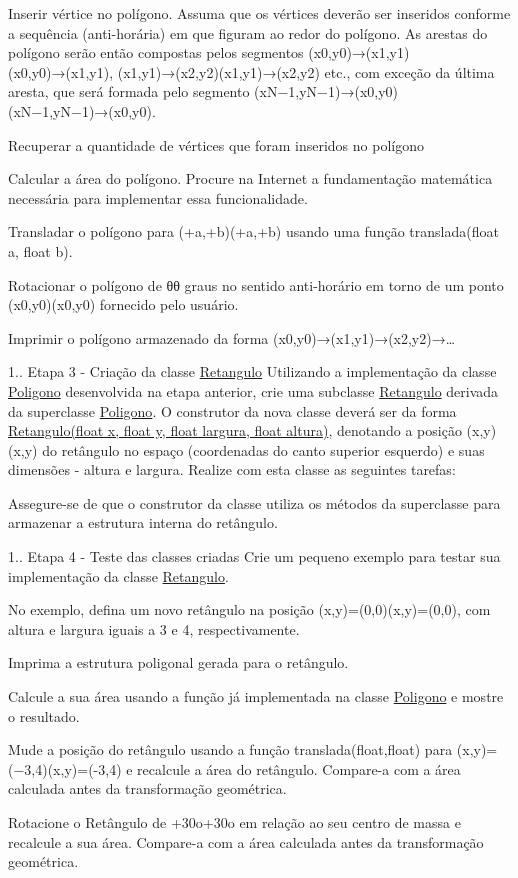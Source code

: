 Inserir vértice no polígono. Assuma que os vértices deverão ser inseridos conforme a sequência (anti-\/horária) em que figuram ao redor do polígono. As arestas do polígono serão então compostas pelos segmentos (x0,y0)→(x1,y1)(x0,y0)→(x1,y1), (x1,y1)→(x2,y2)(x1,y1)→(x2,y2) etc., com exceção da última aresta, que será formada pelo segmento (x\+N−1,y\+N−1)→(x0,y0)(x\+N−1,y\+N−1)→(x0,y0).

Recuperar a quantidade de vértices que foram inseridos no polígono

Calcular a área do polígono. Procure na Internet a fundamentação matemática necessária para implementar essa funcionalidade.

Transladar o polígono para (+a,+b)(+a,+b) usando uma função translada(float a, float b).

Rotacionar o polígono de θθ graus no sentido anti-\/horário em torno de um ponto (x0,y0)(x0,y0) fornecido pelo usuário.

Imprimir o polígono armazenado da forma (x0,y0)→(x1,y1)→(x2,y2)→…​

1.. Etapa 3 -\/ Criação da classe \hyperlink{class_retangulo}{Retangulo} Utilizando a implementação da classe \hyperlink{class_poligono}{Poligono} desenvolvida na etapa anterior, crie uma subclasse \hyperlink{class_retangulo}{Retangulo} derivada da superclasse \hyperlink{class_poligono}{Poligono}. O construtor da nova classe deverá ser da forma \hyperlink{class_retangulo}{Retangulo(float x, float y, float largura, float altura)}, denotando a posição (x,y)(x,y) do retângulo no espaço (coordenadas do canto superior esquerdo) e suas dimensões -\/ altura e largura. Realize com esta classe as seguintes tarefas\+:

Assegure-\/se de que o construtor da classe utiliza os métodos da superclasse para armazenar a estrutura interna do retângulo.

1.. Etapa 4 -\/ Teste das classes criadas Crie um pequeno exemplo para testar sua implementação da classe \hyperlink{class_retangulo}{Retangulo}.

No exemplo, defina um novo retângulo na posição (x,y)=(0,0)(x,y)=(0,0), com altura e largura iguais a 3 e 4, respectivamente.

Imprima a estrutura poligonal gerada para o retângulo.

Calcule a sua área usando a função já implementada na classe \hyperlink{class_poligono}{Poligono} e mostre o resultado.

Mude a posição do retângulo usando a função translada(float,float) para (x,y)=(−3,4)(x,y)=(-\/3,4) e recalcule a área do retângulo. Compare-\/a com a área calculada antes da transformação geométrica.

Rotacione o Retângulo de +30o+30o em relação ao seu centro de massa e recalcule a sua área. Compare-\/a com a área calculada antes da transformação geométrica. 